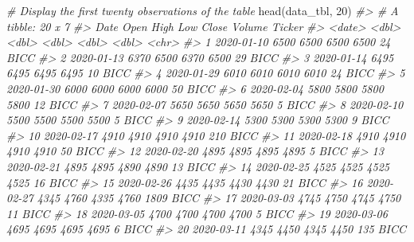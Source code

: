 \documentclass[
]{article}
\newenvironment{Shaded}{\begin{snugshade}}{\end{snugshade}}
\newcommand{\CommentTok}[1]{\textcolor[rgb]{0.56,0.35,0.01}{\textit{#1}}}
\newcommand{\DecValTok}[1]{\textcolor[rgb]{0.00,0.00,0.81}{#1}}
\newcommand{\FunctionTok}[1]{\textcolor[rgb]{0.00,0.00,0.00}{#1}}
\newcommand{\NormalTok}[1]{#1}
\begin{document}
\begin{Shaded}
\begin{Highlighting}[]
\CommentTok{\# Display the first twenty observations of the table}
\FunctionTok{head}\NormalTok{(data\_tbl, }\DecValTok{20}\NormalTok{)}
\CommentTok{\#\textgreater{} \# A tibble: 20 x 7}
\CommentTok{\#\textgreater{}    Date        Open  High   Low Close Volume Ticker}
\CommentTok{\#\textgreater{}    \textless{}date\textgreater{}     \textless{}dbl\textgreater{} \textless{}dbl\textgreater{} \textless{}dbl\textgreater{} \textless{}dbl\textgreater{}  \textless{}dbl\textgreater{} \textless{}chr\textgreater{} }
\CommentTok{\#\textgreater{}  1 2020{-}01{-}10  6500  6500  6500  6500     24 BICC  }
\CommentTok{\#\textgreater{}  2 2020{-}01{-}13  6370  6500  6370  6500     29 BICC  }
\CommentTok{\#\textgreater{}  3 2020{-}01{-}14  6495  6495  6495  6495     10 BICC  }
\CommentTok{\#\textgreater{}  4 2020{-}01{-}29  6010  6010  6010  6010     24 BICC  }
\CommentTok{\#\textgreater{}  5 2020{-}01{-}30  6000  6000  6000  6000     50 BICC  }
\CommentTok{\#\textgreater{}  6 2020{-}02{-}04  5800  5800  5800  5800     12 BICC  }
\CommentTok{\#\textgreater{}  7 2020{-}02{-}07  5650  5650  5650  5650      5 BICC  }
\CommentTok{\#\textgreater{}  8 2020{-}02{-}10  5500  5500  5500  5500      5 BICC  }
\CommentTok{\#\textgreater{}  9 2020{-}02{-}14  5300  5300  5300  5300      9 BICC  }
\CommentTok{\#\textgreater{} 10 2020{-}02{-}17  4910  4910  4910  4910    210 BICC  }
\CommentTok{\#\textgreater{} 11 2020{-}02{-}18  4910  4910  4910  4910     50 BICC  }
\CommentTok{\#\textgreater{} 12 2020{-}02{-}20  4895  4895  4895  4895      5 BICC  }
\CommentTok{\#\textgreater{} 13 2020{-}02{-}21  4895  4895  4890  4890     13 BICC  }
\CommentTok{\#\textgreater{} 14 2020{-}02{-}25  4525  4525  4525  4525     16 BICC  }
\CommentTok{\#\textgreater{} 15 2020{-}02{-}26  4435  4435  4430  4430     21 BICC  }
\CommentTok{\#\textgreater{} 16 2020{-}02{-}27  4345  4760  4335  4760   1809 BICC  }
\CommentTok{\#\textgreater{} 17 2020{-}03{-}03  4745  4750  4745  4750     11 BICC  }
\CommentTok{\#\textgreater{} 18 2020{-}03{-}05  4700  4700  4700  4700      5 BICC  }
\CommentTok{\#\textgreater{} 19 2020{-}03{-}06  4695  4695  4695  4695      6 BICC  }
\CommentTok{\#\textgreater{} 20 2020{-}03{-}11  4345  4450  4345  4450    135 BICC}



\end{Highlighting}
\end{Shaded}
\end{document}
